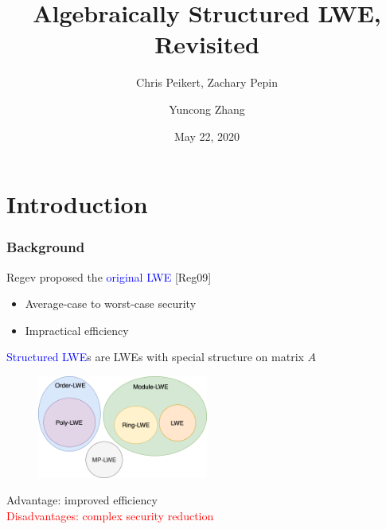 \documentclass{beamer}
\title{Algebraically Structured LWE, Revisited}
\subtitle{Chris Peikert, Zachary Pepin}
\author{Yuncong Zhang}
\date{May 22, 2020}
\newcommand{\blue}[1]{\textcolor{blue}{#1}}
\newcommand{\dgreen}[1]{\textcolor{dgreen}{#1}}
\newcommand{\red}[1]{\textcolor{red}{#1}}
\begin{document}
\frame{\titlepage}


\section{Introduction}
\frame
{
  \frametitle{Background}
  Regev proposed the \blue{original LWE} [Reg09]

  \begin{itemize}
  	\item Average-case to worst-case security
  	\item Impractical efficiency
  \end{itemize}

  \blue{Structured LWE}s are LWEs with special structure on matrix $A$
  \begin{figure}[ht!]
  \includegraphics[width=0.5\textwidth]{files/Structured-LWE.png}
  \end{figure}

  \dgreen{Advantage: improved efficiency}\\
  \red{Disadvantages: complex security reduction}

}
\end{document}
